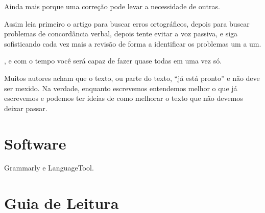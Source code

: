 \documentclass[openany]{book}
\begin{document}
 Ainda mais porque uma correção pode levar a necessidade de outras.

 Assim leia primeiro o artigo para buscar erros ortográficos, depois para buscar problemas de concordância verbal, depois tente evitar a voz passiva, e siga sofisticando cada vez mais a revisão de forma a identificar os problemas um a um.

, e com o tempo você será capaz de fazer quase todas em uma vez só.


 Muitos autores acham que o texto, ou parte do texto, ``já está pronto'' e não deve ser mexido. Na verdade, enquanto escrevemos entendemos melhor o que já escrevemos e podemos ter ideias de como melhorar o texto que não devemos deixar passar.

\chapter{Software}
\label{sec:software}
Grammarly e LanguageTool.

\chapter{Guia de Leitura}


\backmatter

\printbibliography

\newpage

\listofsubjects
\end{document}
